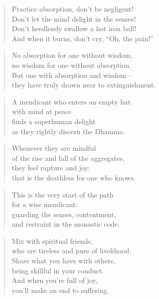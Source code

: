 \documentclass[12pt,openany]{book}%
\begin{document}
\begin{verse}%
Practice absorption, don’t be negligent! \\
Don’t let the mind delight in the senses! \\
Don’t heedlessly swallow a hot iron ball! \\
And when it burns, don’t cry, “Oh, the pain!” 

%
\end{verse}

\begin{verse}%
No absorption for one without wisdom, \\
no wisdom for one without absorption. \\
But one with absorption and wisdom—\\
they have truly drawn near to extinguishment. 

%
\end{verse}

\begin{verse}%
A mendicant who enters an empty hut \\
with mind at peace \\
finds a superhuman delight \\
as they rightly discern the Dhamma. 

%
\end{verse}

\begin{verse}%
Whenever they are mindful \\
of the rise and fall of the aggregates, \\
they feel rapture and joy: \\
that is the deathless for one who knows. 

%
\end{verse}

\begin{verse}%
This is the very start of the path \\
for a wise mendicant: \\
guarding the senses, contentment, \\
and restraint in the monastic code. 

%
\end{verse}

\begin{verse}%
Mix with spiritual friends, \\
who are tireless and pure of livelihood. \\
Share what you have with others, \\
being skillful in your conduct. \\
And when you’re full of joy, \\
you’ll make an end to suffering. 

%
\end{verse}
\end{document}
